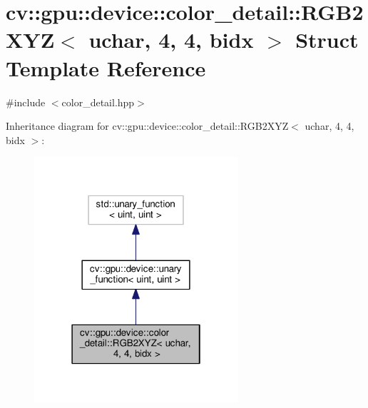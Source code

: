 \hypertarget{structcv_1_1gpu_1_1device_1_1color__detail_1_1RGB2XYZ_3_01uchar_00_014_00_014_00_01bidx_01_4}{\section{cv\-:\-:gpu\-:\-:device\-:\-:color\-\_\-detail\-:\-:R\-G\-B2\-X\-Y\-Z$<$ uchar, 4, 4, bidx $>$ Struct Template Reference}
\label{structcv_1_1gpu_1_1device_1_1color__detail_1_1RGB2XYZ_3_01uchar_00_014_00_014_00_01bidx_01_4}
}


{\ttfamily \#include $<$color\-\_\-detail.\-hpp$>$}



Inheritance diagram for cv\-:\-:gpu\-:\-:device\-:\-:color\-\_\-detail\-:\-:R\-G\-B2\-X\-Y\-Z$<$ uchar, 4, 4, bidx $>$\-:\nopagebreak
\begin{figure}[H]
\begin{center}
\leavevmode
\includegraphics[width=214pt]{structcv_1_1gpu_1_1device_1_1color__detail_1_1RGB2XYZ_3_01uchar_00_014_00_014_00_01bidx_01_4__inherit__graph}
\end{center}
\end{figure}


